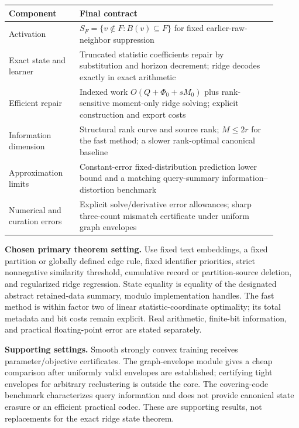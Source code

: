 \documentclass[11pt,a4paper]{article}
\theoremstyle{definition}\newtheorem{definition}[theorem]{Definition}
\begin{document}
\begin{center}\small
\begin{tabular}{p{0.24\linewidth}p{0.67\linewidth}}
\toprule
Component & Final contract\\\midrule
Activation & $S_F=\{v\notin F:B(v)\subseteq F\}$ for fixed earlier-raw-neighbor suppression\\[3pt]
Exact state and learner & Truncated statistic coefficients repair by substitution and horizon decrement; ridge decodes exactly in exact arithmetic\\[3pt]
Efficient repair & Indexed work $O(Q+\Phi_0+sM_0)$ plus rank-sensitive moment-only ridge solving; explicit construction and export costs\\[3pt]
Information dimension & Structural rank curve and source rank; $M\le2r$ for the fast method; a slower rank-optimal canonical baseline\\[3pt]
Approximation limits & Constant-error fixed-distribution prediction lower bound and a matching query-summary information--distortion benchmark\\[3pt]
Numerical and curation errors & Explicit solve/derivative error allowances; sharp three-count mismatch certificate under uniform graph envelopes\\
\bottomrule
\end{tabular}
\end{center}

\textbf{Chosen primary theorem setting.} Use fixed text embeddings, a fixed partition or globally defined edge rule, fixed identifier priorities, strict nonnegative similarity threshold, cumulative record or partition-source deletion, and regularized ridge regression. State equality is equality of the designated abstract retained-data summary, modulo implementation handles. The fast method is within factor two of linear statistic-coordinate optimality; its total metadata and bit costs remain explicit. Real arithmetic, finite-bit information, and practical floating-point error are stated separately.

\textbf{Supporting settings.} Smooth strongly convex training receives parameter/objective certificates. The graph-envelope module gives a cheap comparison after uniformly valid envelopes are established; certifying tight envelopes for arbitrary reclustering is outside the core. The covering-code benchmark characterizes query information and does not provide canonical state erasure or an efficient practical codec. These are supporting results, not replacements for the exact ridge state theorem.
\end{document}
